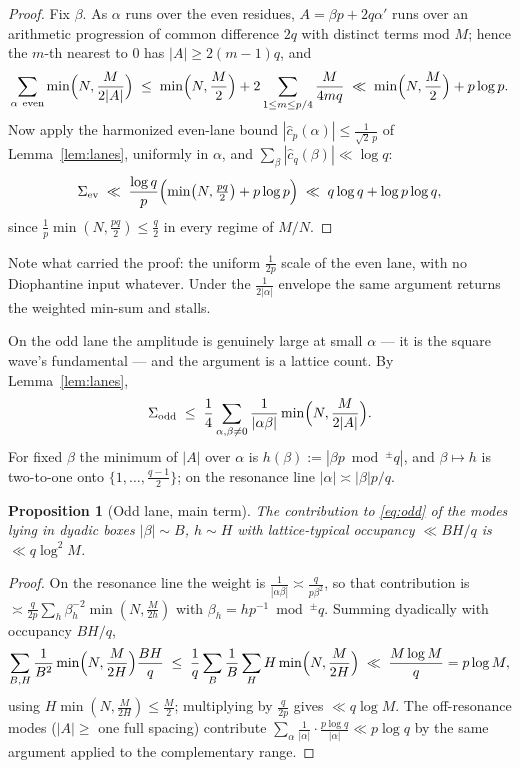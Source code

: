 \documentclass[11pt]{article}
\newtheorem{proposition}[theorem]{Proposition}
\begin{document}
\begin{proof}
Fix $\beta$.  As $\alpha$ runs over the even residues, $A=\beta p+2q\alpha'$ runs over an
arithmetic progression of common difference $2q$ with distinct terms mod $M$; hence the
$m$-th nearest to $0$ has $|A|\ge2(m-1)q$, and
\[
\sum_{\alpha\ \text{even}}\min\Bigl(N,\frac{M}{2|A|}\Bigr)
\;\le\;\min\Bigl(N,\frac M2\Bigr)+2\sum_{1\le m\le p/4}\frac{M}{4mq}
\;\ll\;\min\Bigl(N,\frac M2\Bigr)+p\log p .
\]
Now apply the harmonized even-lane bound $|\hat c_p(\alpha)|\le\frac1{\sqrt2\,p}$ of
Lemma~\ref{lem:lanes}, uniformly in $\alpha$, and $\sum_\beta|\hat c_q(\beta)|\ll\log q$:
\[
\Sigma_{\rm ev}\;\ll\;\frac{\log q}{p}\Bigl(\min\bigl(N,\tfrac{pq}2\bigr)+p\log p\Bigr)
\;\ll\;q\log q+\log p\log q,
\]
since $\frac1p\min(N,\frac{pq}2)\le\frac q2$ in every regime of $M/N$.
\end{proof}

Note what carried the proof: the uniform $\frac1{2p}$ scale of the even lane, with no
Diophantine input whatever.  Under the $\frac1{2|\alpha|}$ envelope the same argument
returns the weighted min-sum and stalls.

On the odd lane the amplitude is genuinely large at small $\alpha$ --- it is the square
wave's fundamental --- and the argument is a lattice count.  By Lemma~\ref{lem:lanes},
\begin{equation}\label{eq:odd}
\Sigma_{\rm odd}\;\le\;\frac14\sum_{\alpha,\beta\ne0}\frac{1}{|\alpha\beta|}
\min\Bigl(N,\frac{M}{2|A|}\Bigr).
\end{equation}
For fixed $\beta$ the minimum of $|A|$ over $\alpha$ is $h(\beta):=|\beta p \bmod^{\pm}q|$,
and $\beta\mapsto h$ is two-to-one onto $\{1,\dots,\frac{q-1}2\}$; on the resonance line
$|\alpha|\asymp|\beta|p/q$.

\begin{proposition}[Odd lane, main term]\label{prop:odd}
The contribution to \eqref{eq:odd} of the modes lying in dyadic boxes
$|\beta|\sim B$, $h\sim H$ with lattice-typical occupancy $\ll BH/q$ is
$\ll q\log^2M$.
\end{proposition}

\begin{proof}
On the resonance line the weight is $\frac1{|\alpha\beta|}\asymp\frac{q}{p\beta^2}$, so
that contribution is $\asymp\frac q{2p}\sum_h\beta_h^{-2}\min(N,\frac M{2h})$ with
$\beta_h=hp^{-1}\bmod^\pm q$.  Summing dyadically with occupancy $BH/q$,
\[
\sum_{B,H}\frac{1}{B^2}\min\Bigl(N,\frac M{2H}\Bigr)\frac{BH}{q}
\;\le\;\frac1q\sum_B\frac1B\sum_H H\min\Bigl(N,\frac M{2H}\Bigr)\;\ll\;\frac{M\log M}{q}=p\log M,
\]
using $H\min(N,\frac M{2H})\le\frac M2$; multiplying by $\frac q{2p}$ gives $\ll q\log M$.
The off-resonance modes ($|A|\ge$ one full spacing) contribute
$\sum_{\alpha}\frac1{|\alpha|}\cdot\frac{p\log q}{|\alpha|}\ll p\log q$ by the same
argument applied to the complementary range.
\end{proof}
\end{document}
